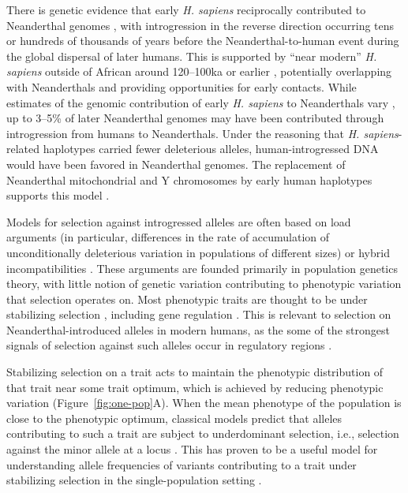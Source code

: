 \documentclass{article}
\begin{document}
There is genetic evidence that early \emph{H. sapiens} reciprocally contributed
to Neanderthal genomes \citep{kuhlwilm2016ancient,hubisz2020mapping}, with
introgression in the reverse direction occurring tens or hundreds of thousands
of years before the Neanderthal-to-human event during the global dispersal of
later humans. This is supported by ``near modern'' \emph{H.  sapiens} outside
of African around 120--100ka or earlier
\citep{schwarcz1988esr,grun2005u,beyer2021climatic}, potentially overlapping
with Neanderthals and providing opportunities for early contacts. While
estimates of the genomic contribution of early \emph{H. sapiens} to
Neanderthals vary \citep{kuhlwilm2016ancient,hubisz2020mapping}, up to 3--5\%
of later Neanderthal genomes may have been contributed through introgression
from humans to Neanderthals. Under the reasoning that \emph{H.
sapiens}-related haplotypes carried fewer deleterious alleles,
human-introgressed DNA would have been favored in Neanderthal genomes. The
replacement of Neanderthal mitochondrial and Y chromosomes by early human
haplotypes supports this model \citep{posth2017deeply,petr2020evolutionary}.

Models for selection against introgressed alleles are often based on load
arguments (in particular, differences in the rate of accumulation of
unconditionally deleterious variation in populations of different sizes) or
hybrid incompatibilities \citep{muller1942isolating}. These arguments are
founded primarily in population genetics theory, with little notion of genetic
variation contributing to phenotypic variation that selection operates on.
Most phenotypic traits are thought to be under stabilizing selection
\citep{sanjak2018evidence,sella2019thinking}, including gene regulation
\citep{gilad2006natural,hodgins2015gene,price2022detecting}. This is relevant
to selection on Neanderthal-introduced alleles in modern humans, as the some of
the strongest signals of selection against such alleles occur in regulatory
regions \citep{sankararaman2014genomic}.

Stabilizing selection on a trait acts to maintain the phenotypic distribution
of that trait near some trait optimum, which is achieved by reducing phenotypic
variation (Figure~\ref{fig:one-pop}A). When the mean phenotype of the
population is close to the phenotypic optimum, classical models predict that
alleles contributing to such a trait are subject to underdominant selection,
i.e., selection against the minor allele at a locus
\citep{robertson1956effect}. This has proven to be a useful model for
understanding allele frequencies of variants contributing to a trait under
stabilizing selection in the single-population setting
\citep[e.g.,][]{keightley1988quantitative, simons2018population,
hayward2022polygenic}.
\end{document}
